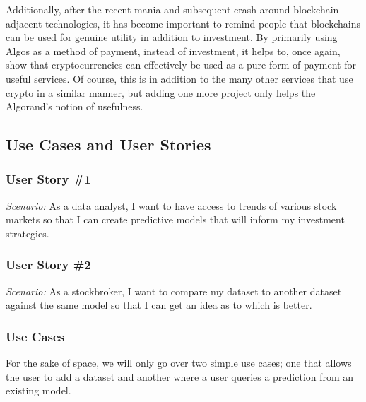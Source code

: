 \documentclass{article}
\begin{document}
    Additionally, after the recent mania and subsequent crash around blockchain adjacent technologies, it has become
    important to remind people that blockchains can be used for genuine utility in addition to investment.  By primarily
    using Algos as a method of payment, instead of investment, it helps to, once again, show that cryptocurrencies can
    effectively be used as a pure form of payment for useful services.  Of course, this is in addition to the many other
    services that use crypto in a similar manner, but adding one more project only helps the Algorand's notion of usefulness.


    \subsection{Use Cases and User Stories}

    \subsubsection*{User Story \#1}
    \textit{Scenario:} As a data analyst, I want to have access to trends of various stock markets so that I can create
    predictive models that will inform my investment strategies.

    \subsubsection*{User Story \#2}
    \textit{Scenario:} As a stockbroker, I want to compare my dataset to another dataset against the same model so that
    I can get an idea as to which is better.

    \subsubsection*{Use Cases}
    For the sake of space, we will only go over two simple use cases; one that allows the user to add a dataset and
    another where a user queries a prediction from an existing model.
\end{document}
